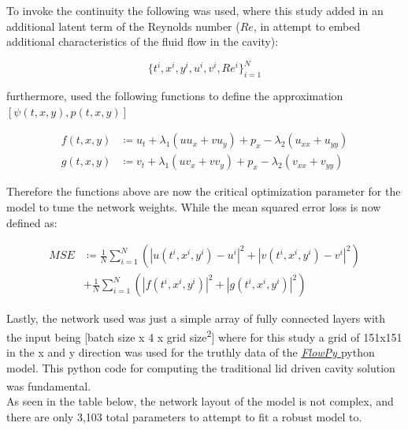 \documentclass{article}
\begin{document}
\noindent To invoke the continuity  the following was used, where this
study added in an additional latent term of the Reynolds number ($Re$, in
attempt to embed additional characteristics of the fluid flow in the cavity):

\begin{equation}
	\{t^i, x^i, y^i, u^i, v^i, Re^i\}^{N}_{i=1}
\end{equation}

\noindent furthermore, \citeauthor{DBLP:journals/corr/abs-1711-10566}
used the following functions to define the approximation $\left[ \psi(t,x,y),
		p(t,x,y)\right]$

\begin{equation}
	\begin{aligned}
		f(t,x,y) & \coloneqq u_t + \lambda_1 ( u u_x + v u_y) +
		p_x - \lambda_{2}(u_{xx} + u_{yy})                      \\
		g(t,x,y) & \coloneqq v_t + \lambda_1 ( u v_x + v v_y) +
		p_x - \lambda_{2}(v_{xx} + v_{yy})
	\end{aligned}
\end{equation}

\noindent Therefore the functions above are now the critical
optimization parameter for the model to tune the network weights. While the
mean squared error loss is now defined as:

\begin{align}
	MSE & \coloneqq \frac{1}{N} \sum_{i=1}^{N} ( |u(t^i,x^i,y^i) -
	u^i |^2 + | v(t^i,x^i,y^i) - v^i |^2)                          \\
	    & + \frac{1}{N} \sum_{i=1}^{N} ( |f(t^i,x^i,y^i)|^2 + |
	g(t^i,x^i,y^i)|^2)
\end{align}

\noindent Lastly, the network used was just a simple array of fully
connected layers with the input being [batch size x 4 x grid
		size\textsuperscript{2}] where for this study a grid of 151x151 in the x and y
direction was used for the truthly data of the
\textit{\underline{\href{https://github.com/gauravsdeshmukh/FlowPy}{FlowPy} }}
python model. This python code for computing the traditional lid driven cavity
solution was fundamental.\textsuperscript{\cite{Barba2019, FlowPy}} \\

\noindent As seen in the table below, the network layout of the model
is not complex, and there are only 3,103 total parameters to attempt to fit a
robust model to. \\
\end{document}
